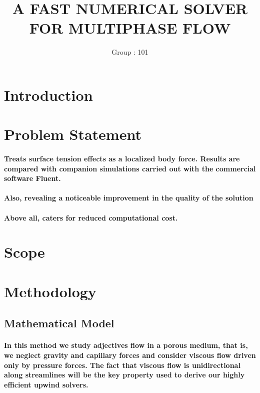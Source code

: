 \documentclass{article}
\begin{document}
		\title{A FAST NUMERICAL SOLVER FOR MULTIPHASE FLOW}
		\author{Group : 101}
		\maketitle
	
		\tableofcontents
	\newpage	

\section{Introduction}

\section{Problem Statement}
	\paragraph{Treats surface tension effects as a localized body force. Results are compared with companion simulations carried 	out with the commercial software Fluent.}
	\paragraph{Also, revealing a noticeable improvement in the quality of the solution}
	\paragraph{Above all, caters for reduced computational cost.}

	\section{Scope}

	\section{Methodology}
	
\subsection{Mathematical Model}
	\paragraph{In this method we study adjectives flow in a porous medium, that is, we
	neglect gravity and capillary forces and consider viscous flow driven only by
	pressure forces. The fact that viscous flow is unidirectional along streamlines
	will be the key property used to derive our highly efficient upwind solvers.}
\end{document}
